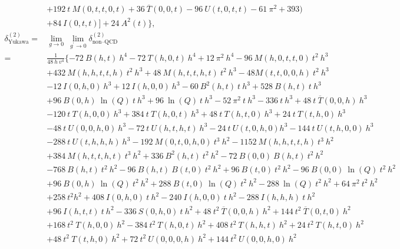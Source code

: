 \documentclass[a4paper,12pt]{book}
\begin{document}
\begin{appendices}
\begin{align}
\nonumber
&+192\> t\> M(0,t,t,0,t)+36\>
   \overline{T}(0,0,t)-96\> U(t,0,t,t)-61\> \pi^2+393)\\
   &+84\>
I(0,t,t)]+24\> A^2(t)\},\\
\nonumber
\delta^{(2)}_\text{Yukawa} ={}& \lim_{g \rightarrow 0}\> \lim_{g^\prime \rightarrow 0} \delta^{(2)}_\text{non--QCD}\\
   \nonumber
={}& \frac{1}{48\> h\> v^4}\{-72\> B(h,t)\> h^4-72 \>T(h,0,t)\> h^4+12\> \pi^2 \>h^4-96\> M(h,0,t,t,0)\> t^2\> h^3\\
\nonumber
&+432\> M(h,h,t,t,h)\> t^2\> h^3+48\> M(h,t,t,h,t)\> t^2\> h^3-48 M(t,t,0,0,h)\> t^2\> h^3\\
\nonumber
&-12\> I(0,h,0)\> h^3+12\> I(h,0,0) \>h^3-60\>
   B^2(h,t)\> t\> h^3+528 \>B(h,t)\> t\> h^3\\
   \nonumber
   &+96\> B(0,h)\> \ln(Q) \>t \>h^3+96\> \ln(Q)\> t
\>h^3-52\> \pi^2 \>t \>h^3-336\> t\>
   h^3+48 \>t\> \overline{T}(0,0,h)\> h^3\\
   \nonumber
   &-120\> t\> T(h,0,0)\> h^3+384\> t\> T(h,0,t)
\>h^3+48\> t\> T(h,t,0)\> h^3+24\> t\>
   T(t,h,0) \>h^3\\
   \nonumber 
   &-48\> t \>U(0,0,h,0) \>h^3-72\> t\> U(h,t,h,t)\> h^3-24\> t\> U(t,0,h,0) h^3-144\> t\> U(t,h,0,0)\>
   h^3\\
   \nonumber
   &-288\> t\> U(t,h,h,h) \>h^3-192\> M(0,t,0,h,0)\> t^3\> h^2-1152\> M(h,h,t,t,h)\> t^3\> h^2\\
   \nonumber 
   &+384\> M(h,t,t,h,t)
\>   t^3 \>h^2+336\> B^2(h,t) \>t^2\> h^2-72\> B(0,0) \>B(h,t)\> t^2\> h^2\\
\nonumber
&-768\> B(h,t)\> t^2\> h^2-96\>
   B(h,t)\> B(t,0)\> t^2 \>h^2+96\> B(t,0)\> t^2\> h^2-96\> B(0,0)\> \ln(Q)
\>t^2 \>h^2\\
\nonumber
&+96 \>B(0,h) \>\ln(Q)\> t^2
   \>h^2+288 \>B(t,0) \>\ln(Q) \>t^2 \>h^2-288 \>\ln(Q)\> t^2 \>h^2+64\> \pi^2\> t^2\> h^2\\
   \nonumber
   &+258\> t^2
h^2+408\> I(0,h,0)\> t\> h^2-240
   \>I(h,0,0)\> t \>h^2-288\> I(h,h,h)\> t\> h^2\\
   \nonumber
   &+96\> I(h,t,t) \>t \>h^2-336 \>S(0,h,0)\> t \>h^2+48\> t^2\>
   \overline{T}(0,0,h)\> h^2+144\> t^2\> \overline{T}(0,t,0)\> h^2\\
   \nonumber
   &+168\> t^2\> T(h,0,0)\>
h^2-384\> t^2 \>T(h,0,t)\> h^2+408
   \>t^2\> T(h,h,t)\> h^2+24\> t^2\> T(h,t,0)\> h^2\\
   \nonumber 
   &+48 \>t^2 \>T(t,h,0) \>h^2+72\>
t^2\> U(0,0,0,h)\> h^2+144 \>t^2
 \>  U(0,0,h,0)\> h^2\\

\end{align}
\end{appendices}
\end{document}
